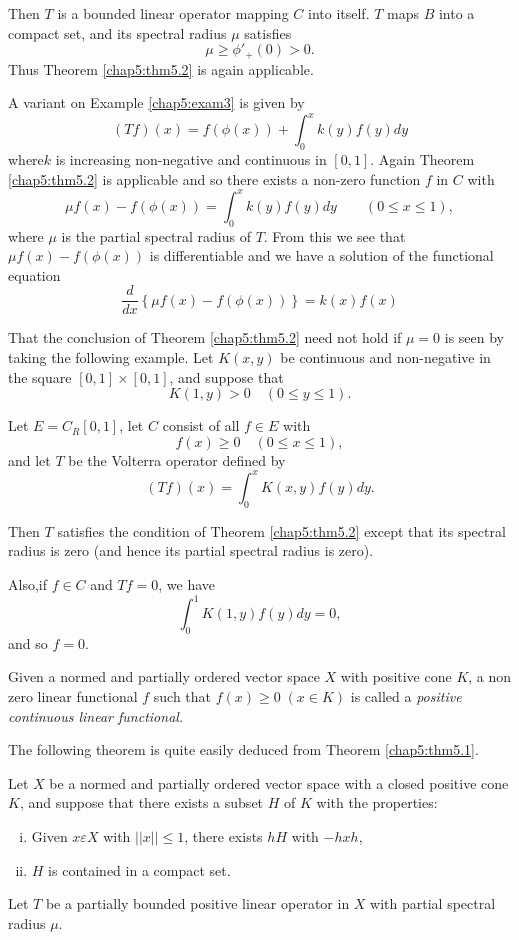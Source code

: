 Then $T$ is a bounded linear operator mapping $C$ into itself. $T$
maps $B$ into a compact set, and its spectral radius $\mu$ satisfies  
$$
\mu \geq \phi'_+ (0) > 0 .
$$
Thus Theorem \ref{chap5:thm5.2} is again applicable. 

\begin{exam} %
  A variant on Example \ref{chap5:exam3} is given by
  $$
  (Tf) (x) = f(\phi (x)) + \int^x_0 k(y) f(y) dy
  $$
  where\pageoriginale $k$ is increasing non-negative and continuous in
  $[0,1]$. Again Theorem \ref{chap5:thm5.2} is applicable and so there
  exists a non-zero function $f$ in $C$ with 
  $$
  \mu f (x) -f (\phi (x)) = \int^x_0 k (y) f (y) dy \qquad (0 \le x \le 1),
  $$
  where $\mu$ is the partial spectral radius of $T$. From this we see
  that $\mu f (x) - f (\phi (x))$ is differentiable and we have a
  solution of the functional equation 
  $$
  \frac{d}{dx} \left\{ \mu f (x) - f (\phi (x))\right\} = k (x) f (x)
  $$
\end{exam} 

\begin{exam}%
  That the conclusion of Theorem \ref{chap5:thm5.2} need not hold if
  $\mu =0$ is 
  seen by taking the following example. Let $K (x,y)$ be continuous
  and non-negative in the square $[0,1] \times [0,1]$, and suppose
  that   
  $$
  K (1,y) > 0 \quad (0 \le y \le 1).
  $$
\end{exam}

Let $E = C_R [0,1]$, let $C$ consist of all $f \in E$ with
$$
f (x) \ge 0 \quad (0 \le x \le 1),
$$
and let $T$ be the Volterra operator defined by
$$
(Tf) (x) = \int^x_0 K (x,y) f (y) dy.
$$

Then $T$ satisfies the condition of Theorem \ref{chap5:thm5.2} except that its
spectral radius is zero (and hence its partial spectral radius is
zero). 

Also,\pageoriginale if $f \in C$ and $Tf =0$, we have 
$$
\int^1_0 K (1,y) f (y) dy =0,
$$
and so $f=0$.

\begin{Definition}%
  Given a normed and partially ordered vector space $X$ with positive
  cone $K$, a non zero linear functional $f$ such that $f (x) \ge 0\;  (x
  \in K)$ is called a {\em positive continuous linear
    functional.} 
\end{Definition}

The following theorem is quite easily deduced from Theorem
\ref{chap5:thm5.1}.

\begin{thmm}\label{chap5:thm5.3}%
  Let $X$ be a normed and partially ordered vector space with a closed
  positive cone $K$, and suppose that there exists a subset $H$ of $K$
  with the properties: 
  \begin{enumerate}[(i)]
  \item Given $x \varepsilon X$ with $|| x || \le 1$, there exists $h
    H$ with $-h x h$, 
  \item $H$ is contained in a compact set.
  \end{enumerate}

    Let $T$ be a partially bounded positive linear operator in $X$
    with partial spectral radius $\mu$. 
 \end{thmm} 

